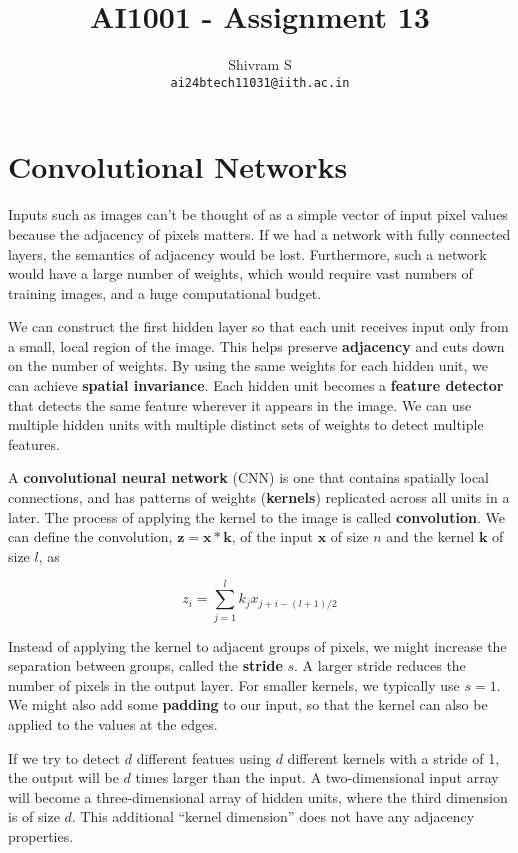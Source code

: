 \documentclass{article}
\author{Shivram S \\ \texttt{ai24btech11031@iith.ac.in}}
\title{AI1001 - Assignment 13}
\begin{document}
\maketitle

\section{Convolutional Networks}

Inputs such as images can't be thought of as a simple vector of input pixel values
because the adjacency of pixels matters. If we had a network with fully connected
layers, the semantics of adjacency would be lost. Furthermore, such a network would
have a large number of weights, which would require vast numbers of training images,
and a huge computational budget.

We can construct the first hidden layer so that each unit receives input only from
a small, local region of the image. This helps preserve \textbf{adjacency} and cuts down on
the number of weights. By using the same weights for each hidden unit, we can achieve
\textbf{spatial invariance}. Each hidden unit becomes a \textbf{feature detector} that detects
the same feature wherever it appears in the image. We can use multiple hidden units
with multiple distinct sets of weights to detect multiple features.

A \textbf{convolutional neural network} (CNN) is one that contains spatially local
connections, and has patterns of weights (\textbf{kernels}) replicated across all
units in a later. The process of applying the kernel to the image is called
\textbf{convolution}. We can define the convolution, $\textbf{z} = \textbf{x} * \textbf{k}$,
of the input $\textbf{x}$ of size $n$ and the kernel $\textbf{k}$ of size $l$, as

\[
z_i = \sum_{j=1}^{l} k_j x_{j + i - (l+1)/2}
\]

Instead of applying the kernel to adjacent groups of pixels, we might increase the
separation between groups, called the \textbf{stride} $s$. A larger stride reduces
the number of pixels in the output layer. For smaller kernels, we typically use $s = 1$.
We might also add some \textbf{padding} to our input, so that the kernel can also
be applied to the values at the edges.

If we try to detect $d$ different featues using $d$ different kernels with a stride of 1, 
the output will be $d$ times larger than the input. A two-dimensional input array
will become a three-dimensional array of hidden units, where the third dimension is of
size $d$. This additional ``kernel dimension'' does not have any adjacency properties.
\end{document}
